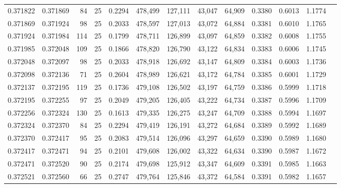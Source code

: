 \begin{tabular}{rrrrrrrrrrrrr}
0.371822 & 0.371869 &    84 &  25 &                                     0.2294 & 478,499 & 127,111 &  43,047 &  64,909 & 0.3380 & 0.6013 & 1.1774 \\
0.371869 & 0.371924 &    98 &  25 &                                     0.2033 & 478,597 & 127,013 &  43,072 &  64,884 & 0.3381 & 0.6010 & 1.1765 \\
0.371924 & 0.371984 &   114 &  25 &                                     0.1799 & 478,711 & 126,899 &  43,097 &  64,859 & 0.3382 & 0.6008 & 1.1755 \\
0.371985 & 0.372048 &   109 &  25 &                                     0.1866 & 478,820 & 126,790 &  43,122 &  64,834 & 0.3383 & 0.6006 & 1.1745 \\
0.372048 & 0.372097 &    98 &  25 &                                     0.2033 & 478,918 & 126,692 &  43,147 &  64,809 & 0.3384 & 0.6003 & 1.1736 \\
0.372098 & 0.372136 &    71 &  25 &                                     0.2604 & 478,989 & 126,621 &  43,172 &  64,784 & 0.3385 & 0.6001 & 1.1729 \\
0.372137 & 0.372195 &   119 &  25 &                                     0.1736 & 479,108 & 126,502 &  43,197 &  64,759 & 0.3386 & 0.5999 & 1.1718 \\
0.372195 & 0.372255 &    97 &  25 &                                     0.2049 & 479,205 & 126,405 &  43,222 &  64,734 & 0.3387 & 0.5996 & 1.1709 \\
0.372256 & 0.372324 &   130 &  25 &                                     0.1613 & 479,335 & 126,275 &  43,247 &  64,709 & 0.3388 & 0.5994 & 1.1697 \\
0.372324 & 0.372370 &    84 &  25 &                                     0.2294 & 479,419 & 126,191 &  43,272 &  64,684 & 0.3389 & 0.5992 & 1.1689 \\
0.372370 & 0.372417 &    95 &  25 &                                     0.2083 & 479,514 & 126,096 &  43,297 &  64,659 & 0.3390 & 0.5989 & 1.1680 \\
0.372417 & 0.372471 &    94 &  25 &                                     0.2101 & 479,608 & 126,002 &  43,322 &  64,634 & 0.3390 & 0.5987 & 1.1672 \\
0.372471 & 0.372520 &    90 &  25 &                                     0.2174 & 479,698 & 125,912 &  43,347 &  64,609 & 0.3391 & 0.5985 & 1.1663 \\
0.372521 & 0.372560 &    66 &  25 &                                     0.2747 & 479,764 & 125,846 &  43,372 &  64,584 & 0.3391 & 0.5982 & 1.1657 \\

\end{tabular}
